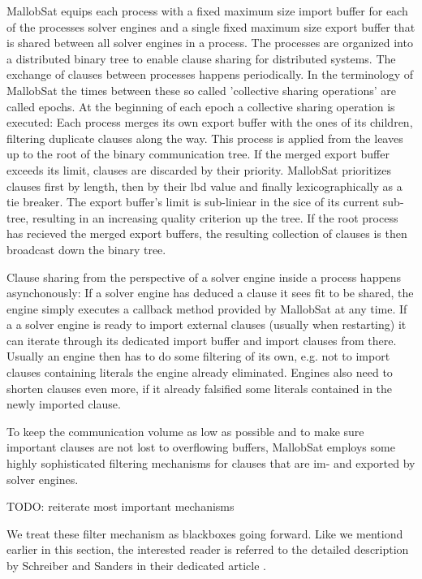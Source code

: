 \documentclass[12pt,a4paper,twoside]{scrartcl}
\numberwithin{equation}{section}
\begin{document}
MallobSat equips each process with a fixed maximum size import buffer for each of the processes solver engines and a single fixed maximum size export buffer that is shared between all solver engines in a process. The processes are organized into a distributed binary tree to enable clause sharing for distributed systems. The exchange of clauses between processes happens periodically. In the terminology of MallobSat the times between these so called 'collective sharing operations' are called epochs.
At the beginning of each epoch a collective sharing operation is executed: Each process merges its own export buffer with the ones of its children, filtering duplicate clauses along the way. This process is applied from the leaves up to the root of the binary communication tree. If the merged export buffer exceeds its limit, clauses are discarded by their priority. MallobSat prioritizes clauses first by length, then by their lbd value and finally lexicographically as a tie breaker. The export buffer's limit is sub-liniear in the sice of its current sub-tree, resulting in an increasing quality criterion up the tree. If the root process has recieved the merged export buffers, the resulting collection of clauses is then broadcast down the binary tree.

Clause sharing from the perspective of a solver engine inside a process happens asynchonously: If a solver engine has deduced a clause it sees fit to be shared, the engine simply executes a callback method provided by MallobSat at any time. If a a solver engine is ready to import external clauses (usually when restarting) it can iterate through its dedicated import buffer and import clauses from there. Usually an engine then has to do some filtering of its own, e.g. not to import clauses containing literals the engine already eliminated. Engines also need to shorten clauses even more, if it already falsified some literals contained in the newly imported clause.

To keep the communication volume as low as possible and to make sure important clauses are not lost to overflowing buffers, MallobSat employs some highly sophisticated filtering mechanisms for clauses that are im- and exported by solver engines. 

TODO: reiterate most important mechanisms

We treat these filter mechanism as blackboxes going forward. Like we mentiond earlier in this section, the interested reader is referred to the detailed description by Schreiber and Sanders in their dedicated article \cite{mallobSat}.
\end{document}
